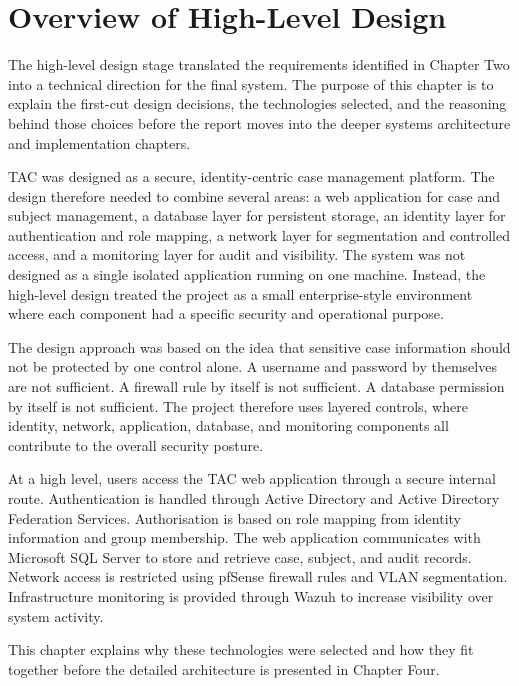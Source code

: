 \raggedright

\section{Overview of High-Level Design}

The high-level design stage translated the requirements identified in Chapter Two into a technical direction for the final system. The purpose of this chapter is to explain the first-cut design decisions, the technologies selected, and the reasoning behind those choices before the report moves into the deeper systems architecture and implementation chapters.

TAC was designed as a secure, identity-centric case management platform. The design therefore needed to combine several areas: a web application for case and subject management, a database layer for persistent storage, an identity layer for authentication and role mapping, a network layer for segmentation and controlled access, and a monitoring layer for audit and visibility. The system was not designed as a single isolated application running on one machine. Instead, the high-level design treated the project as a small enterprise-style environment where each component had a specific security and operational purpose.

The design approach was based on the idea that sensitive case information should not be protected by one control alone. A username and password by themselves are not sufficient. A firewall rule by itself is not sufficient. A database permission by itself is not sufficient. The project therefore uses layered controls, where identity, network, application, database, and monitoring components all contribute to the overall security posture.

At a high level, users access the TAC web application through a secure internal route. Authentication is handled through Active Directory and Active Directory Federation Services. Authorisation is based on role mapping from identity information and group membership. The web application communicates with Microsoft SQL Server to store and retrieve case, subject, and audit records. Network access is restricted using pfSense firewall rules and VLAN segmentation. Infrastructure monitoring is provided through Wazuh to increase visibility over system activity.

This chapter explains why these technologies were selected and how they fit together before the detailed architecture is presented in Chapter Four.

